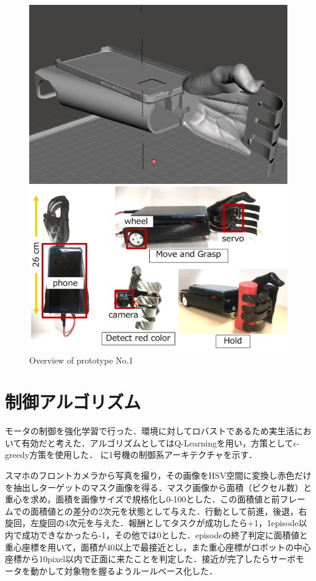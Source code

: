 \begin{figure}
    \centering
    \begin{minipage}{\linewidth}
        \centering
        \includegraphics[width=0.7\linewidth]{figure/chapter3/robothand-v1_cad}
    \end{minipage}
    \begin{minipage}{\linewidth}
        \centering
        \includegraphics[width=0.7\linewidth]{figure/chapter3/1号機外観}
    \end{minipage}
    \caption{Overview of prototype No.1}
    \label{fig:1号機外観}
\end{figure}


\section{制御アルゴリズム}
モータの制御を強化学習で行った．環境に対してロバストであるため実生活において有効だと考えた．アルゴリズムとしてはQ-Learningを用い，方策として$\epsilon$-greedy方策を使用した．
に1号機の制御系アーキテクチャを示す．

スマホのフロントカメラから写真を撮り，その画像をHSV空間に変換し赤色だけを抽出しターゲットのマスク画像を得る．マスク画像から面積（ピクセル数）と重心を求め，面積を画像サイズで規格化し0-100とした．この面積値と前フレームでの面積値との差分の2次元を状態として与えた．行動として前進，後退，右旋回，左旋回の4次元を与えた．報酬としてタスクが成功したら+1，1episode以内で成功できなかったら-1，その他では0とした．episodeの終了判定に面積値と重心座標を用いて，面積が40以上で最接近とし，また重心座標がロボットの中心座標から10pixel以内で正面に来たことを判定した．接近が完了したらサーボモータを動かして対象物を握るようルールベース化した．


